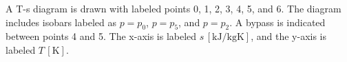 A T-s diagram is drawn with labeled points 0, 1, 2, 3, 4, 5, and 6. The diagram includes isobars labeled as \( p = p_0 \), \( p = p_5 \), and \( p = p_2 \). A bypass is indicated between points 4 and 5. The x-axis is labeled \( s \, [\text{kJ/kgK}] \), and the y-axis is labeled \( T \, [\text{K}] \).